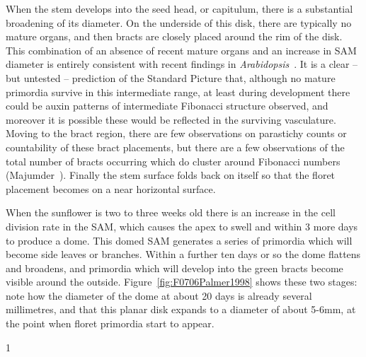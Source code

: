 When the stem develops into the seed head, or capitulum, there is a substantial broadening of its diameter. On the underside of this disk,  there are typically no mature organs, and then bracts are closely placed around the rim of the disk. This combination of an absence of recent mature organs and an increase in SAM diameter is entirely consistent with recent findings in \textit{Arabidopsis}~\cite{shiFeedbackLateralOrgans2018}. It is a clear -- but untested -- prediction of the Standard Picture that, although no mature primordia survive in this intermediate range, at least during development there could be  auxin patterns of intermediate Fibonacci structure observed,  and moreover it is possible these would be reflected in the surviving vasculature. Moving to the bract region,  there are few observations on parastichy counts or countability of these bract placements, but there are a few observations of the total number of bracts occurring which do cluster around Fibonacci numbers (Majumder~\cite{majumderVariationNumberRay1976}). Finally the stem surface folds back on itself so that the floret placement becomes on a near horizontal surface.
	
When the sunflower is two to three weeks old there is an increase in the cell division rate in the SAM, which causes the apex to swell and within 3 more days to produce a dome. This domed SAM generates a series of primordia which will become side leaves or branches.%
Within a further ten days or so the dome flattens and broadens, and primordia which will develop into the green bracts become visible around the outside.  Figure~\ref{fig:F0706Palmer1998} shows these two stages:  note how the diameter of the dome at about 20 days is already several millimetres, and that this planar disk expands to a diameter of about 5-6mm, at the point when floret primordia start to appear.

%
{1}

